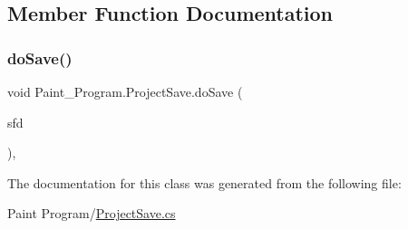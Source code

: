 \subsection{Member Function Documentation}
\mbox{\label{class_paint___program_1_1_project_save_aa28784aaca38fc6348c62daf33b31898}} 
\subsubsection{\texorpdfstring{do\+Save()}{doSave()}}
{\footnotesize\ttfamily void Paint\+\_\+\+Program.\+Project\+Save.\+do\+Save (\begin{DoxyParamCaption}\item[{Save\+File\+Dialog}]{sfd }\end{DoxyParamCaption})\hspace{0.3cm}{\ttfamily [inline]}, {\ttfamily [private]}}



The documentation for this class was generated from the following file\+:\begin{DoxyCompactItemize}
\item 
Paint Program/\mbox{\hyperlink{_project_save_8cs}{Project\+Save.\+cs}}\end{DoxyCompactItemize}
